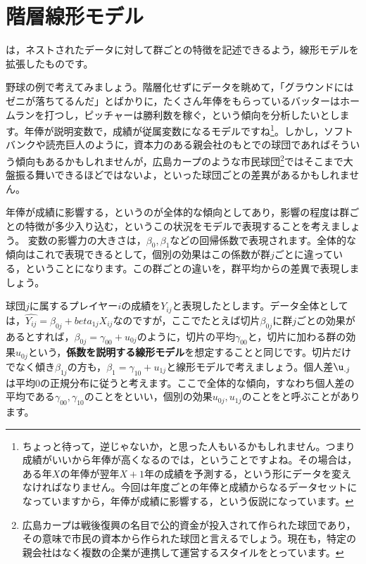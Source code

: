\documentclass{ltjsbook}
\begin{document}
\section{階層線形モデル}
は，ネストされたデータに対して群ごとの特徴を記述できるよう，線形モデルを拡張したものです。

野球の例で考えてみましょう。階層化せずにデータを眺めて，「グラウンドにはゼニが落ちてるんだ」とばかりに，たくさん年俸をもらっているバッターはホームランを打つし，ピッチャーは勝利数を稼ぐ，という傾向を分析したいとします。年俸が説明変数で，成績が従属変数になるモデルですね\footnote{ちょっと待って，逆じゃないか，と思った人もいるかもしれません。つまり成績がいいから年俸が高くなるのでは，ということですよね。その場合は，ある年$X$の年俸が翌年$X+1$年の成績を予測する，という形にデータを変えなければなりません。今回は年度ごとの年俸と成績からなるデータセットになっていますから，年俸が成績に影響する，という仮説になっています。}。しかし，ソフトバンクや読売巨人のように，資本力のある親会社のもとでの球団であればそういう傾向もあるかもしれませんが，広島カープのような市民球団\footnote{広島カープは戦後復興の名目で公的資金が投入されて作られた球団であり，その意味で市民の資本から作られた球団と言えるでしょう。現在も，特定の親会社はなく複数の企業が連携して運営するスタイルをとっています。}ではそこまで大盤振る舞いできるほどではないよ，といった球団ごとの差異があるかもしれません。

年俸が成績に影響する，というのが全体的な傾向としてあり，影響の程度は群ごとの特徴が多少入り込む，というこの状況をモデルで表現することを考えましょう。
変数の影響力の大きさは，$\beta_0,\beta_1$などの回帰係数で表現されます。全体的な傾向はこれで表現できるとして，個別の効果はこの係数が群$j$ごとに違っている，ということになります。この群ごとの違いを，群平均からの差異で表現しましょう。

球団$j$に属するプレイヤー$i$の成績を$Y_{ij}$と表現したとします。データ全体としては，$\hat{Y_{ij}} = \beta_{0j} + beta_{1j} X_{ij}$なのですが，ここでたとえば切片$\beta_{0j}$に群$j$ごとの効果があるとすれば，$\beta_{0j} = \gamma_{00} + u_{0j}$のように，切片の平均$\gamma_{00}$と，切片に加わる群の効果$u_{0j}$という，\textbf{係数を説明する線形モデル}を想定することと同じです。切片だけでなく傾き$\beta_{1j}$の方も，$\beta_{1} = \gamma_{10} + u_{1j}$と線形モデルで考えましょう。個人差$\u_{.j}$は平均$0$の正規分布に従うと考えます。ここで全体的な傾向，すなわち個人差の平均である$\gamma_{00},\gamma_{10}$のことをといい，個別の効果$u_{0j},u_{1j}$のことをと呼ぶことがあります。
\end{document}
